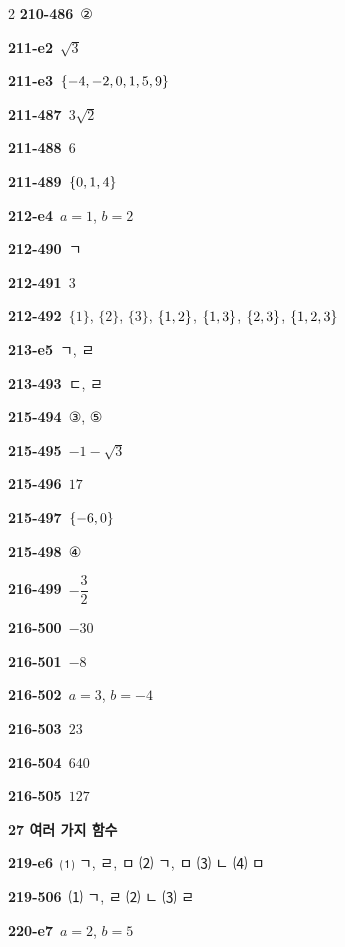 \documentclass[10pt,a4paper]{article}
\begin{document}
\begin{multicols}{2}
\noindent\textbf{210-486}\ ②\par
\noindent\textbf{211-e2}\ $\sqrt{3}$\par
\noindent\textbf{211-e3}\ $\{-4{,}\mkern3mu\mathopen{}-2{,}\mkern3mu\mathopen{}0{,}\mkern3mu\mathopen{}1{,}\mkern3mu\mathopen{}5{,}\mkern3mu\mathopen{}9\}$\par
\noindent\textbf{211-487}\ $3\sqrt{2}$\par
\noindent\textbf{211-488}\ $6$\par
\noindent\textbf{211-489}\ $\{0{,}\mkern3mu\mathopen{}1{,}\mkern3mu\mathopen{}4\}$\par
\noindent\textbf{212-e4}\ $a=1$, $b=2$\par
\noindent\textbf{212-490}\ ㄱ\par
\noindent\textbf{212-491}\ $3$\par
\noindent\textbf{212-492}\ $\{1\}$, $\{2\}$, $\{3\}$, $\{1{,}\mkern3mu\mathopen{}2\}$, $\{1{,}\mkern3mu\mathopen{}3\}$, $\{2{,}\mkern3mu\mathopen{}3\}$, $\{1{,}\mkern3mu\mathopen{}2{,}\mkern3mu\mathopen{}3\}$\par
\noindent\textbf{213-e5}\ ㄱ, ㄹ\par
\noindent\textbf{213-493}\ ㄷ, ㄹ\par
\noindent\textbf{215-494}\ ③, ⑤\par
\noindent\textbf{215-495}\ $-1-\sqrt{3}$\par
\noindent\textbf{215-496}\ $17$\par
\noindent\textbf{215-497}\ $\{-6{,}\mkern3mu\mathopen{}0\}$\par
\noindent\textbf{215-498}\ ④\par
\noindent\textbf{216-499}\ $-\dfrac{3}{2}$\par
\noindent\textbf{216-500}\ $-30$\par
\noindent\textbf{216-501}\ $-8$\par
\noindent\textbf{216-502}\ $a=3$, $b=-4$\par
\noindent\textbf{216-503}\ $23$\par
\noindent\textbf{216-504}\ $640$\par
\noindent\textbf{216-505}\ $127$\par
\noindent\textbf{27 여러 가지 함수}\par\smallskip
\noindent\textbf{219-e6}\ ⑴ ㄱ, ㄹ, ㅁ ⑵ ㄱ, ㅁ ⑶ ㄴ ⑷ ㅁ\par
\noindent\textbf{219-506}\ ⑴ ㄱ, ㄹ ⑵ ㄴ ⑶ ㄹ\par
\noindent\textbf{220-e7}\ $a=2$, $b=5$\par

\end{multicols}
\end{document}

